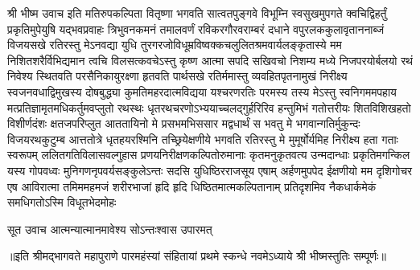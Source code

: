 
श्री भीष्म उवाच
\twolineshloka
{इति मतिरुपकल्पिता वितृष्णा भगवति सात्वतपुङ्गवे विभूम्नि}
{स्वसुखमुपगते क्वचिद्विहर्तुं प्रकृतिमुपेयुषि यद्भवप्रवाहः}
\twolineshloka
{त्रिभुवनकमनं तमालवर्णं रविकरगौरवराम्बरं दधाने}
{वपुरलककुलावृताननाब्जं विजयसखे रतिरस्तु मेऽनवद्या}
\twolineshloka
{युधि तुरगरजोविधूम्रविष्वक्कचलुलितश्रमवार्यलङ्कृतास्ये}
{मम निशितशरैर्विभिद्यमान त्वचि विलसत्कवचेऽस्तु कृष्ण आत्मा}
\twolineshloka
{सपदि सखिवचो निशम्य मध्ये निजपरयोर्बलयो रथं निवेश्य}
{स्थितवति परसैनिकायुरक्ष्णा हृतवति पार्थसखे रतिर्ममास्तु}
\twolineshloka
{व्यवहितपृतनामुखं निरीक्ष्य स्वजनवधाद्विमुखस्य दोषबुद्ध्या}
{कुमतिमहरदात्मविद्यया यश्चरणरतिः परमस्य तस्य मेऽस्तु}
\twolineshloka
{स्वनिगममपहाय मत्प्रतिज्ञामृतमधिकर्तुमवप्लुतो रथस्थः}
{धृतरथचरणोऽभ्ययाच्चलद्गुर्हरिरिव हन्तुमिभं गतोत्तरीयः}
\twolineshloka
{शितविशिखहतो विशीर्णदंशः क्षतजपरिप्लुत आततायिनो मे}
{प्रसभमभिससार मद्वधार्थं स भवतु मे भगवान्गतिर्मुकुन्दः}
\twolineshloka
{विजयरथकुटुम्ब आत्ततोत्रे धृतहयरश्मिनि तच्छ्रियेक्षणीये}
{भगवति रतिरस्तु मे मुमूर्षोर्यमिह निरीक्ष्य हता गताः स्वरूपम्}
\twolineshloka
{ललितगतिविलासवल्गुहास प्रणयनिरीक्षणकल्पितोरुमानाः}
{कृतमनुकृतवत्य उन्मदान्धाः प्रकृतिमगन्किल यस्य गोपवध्वः}
\twolineshloka
{मुनिगणनृपवर्यसङ्कुलेऽन्तः सदसि युधिष्ठिरराजसूय एषाम्}
{अर्हणमुपपेद ईक्षणीयो मम दृशिगोचर एष आविरात्मा}
\twolineshloka
{तमिममहमजं शरीरभाजां हृदि हृदि धिष्ठितमात्मकल्पितानाम्}
{प्रतिदृशमिव नैकधार्कमेकं समधिगतोऽस्मि विधूतभेदमोहः}

सूत उवाच
{आत्मन्यात्मानमावेश्य सोऽन्तःश्वास उपारमत्}

{॥इति श्रीमद्भागवते महापुराणे पारमहंस्यां संहितायां प्रथमे स्कन्धे नवमेऽध्याये श्री भीष्मस्तुतिः सम्पूर्णः॥}
